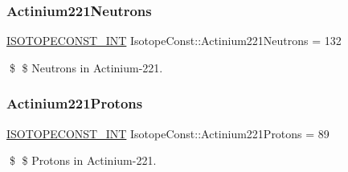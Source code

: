 \subsubsection{\texorpdfstring{Actinium221\+Neutrons}{Actinium221Neutrons}}
{\footnotesize\ttfamily \mbox{\hyperlink{group___isotope_const-_macros_ga5f18360b3e99483a35c32d789e62621c}{I\+S\+O\+T\+O\+P\+E\+C\+O\+N\+S\+T\+\_\+\+I\+NT}} Isotope\+Const\+::\+Actinium221\+Neutrons = 132}

\$ \$ Neutrons in Actinium-\/221. \mbox{\label{group___isotope_const-_actinium-_ac221_ga976491bd00a2213e44d82603d10f742e}} 
\subsubsection{\texorpdfstring{Actinium221\+Protons}{Actinium221Protons}}
{\footnotesize\ttfamily \mbox{\hyperlink{group___isotope_const-_macros_ga5f18360b3e99483a35c32d789e62621c}{I\+S\+O\+T\+O\+P\+E\+C\+O\+N\+S\+T\+\_\+\+I\+NT}} Isotope\+Const\+::\+Actinium221\+Protons = 89}

\$ \$ Protons in Actinium-\/221. 